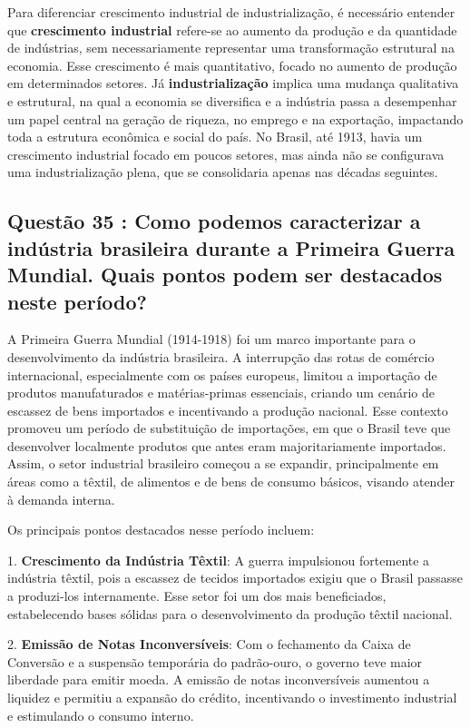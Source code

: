 \documentclass[a4paper,12pt]{article}[abntex2]
\begin{document}
Para diferenciar crescimento industrial de industrialização, é necessário entender que \textbf{crescimento industrial} refere-se ao aumento da produção e da quantidade de indústrias, sem necessariamente representar uma transformação estrutural na economia. Esse crescimento é mais quantitativo, focado no aumento de produção em determinados setores. Já \textbf{industrialização} implica uma mudança qualitativa e estrutural, na qual a economia se diversifica e a indústria passa a desempenhar um papel central na geração de riqueza, no emprego e na exportação, impactando toda a estrutura econômica e social do país. No Brasil, até 1913, havia um crescimento industrial focado em poucos setores, mas ainda não se configurava uma industrialização plena, que se consolidaria apenas nas décadas seguintes.

\subsection{\textbf{Questão 35 : Como podemos caracterizar a indústria brasileira durante a Primeira Guerra Mundial. Quais pontos podem ser destacados neste período?}}

A Primeira Guerra Mundial (1914-1918) foi um marco importante para o desenvolvimento da indústria brasileira. A interrupção das rotas de comércio internacional, especialmente com os países europeus, limitou a importação de produtos manufaturados e matérias-primas essenciais, criando um cenário de escassez de bens importados e incentivando a produção nacional. Esse contexto promoveu um período de substituição de importações, em que o Brasil teve que desenvolver localmente produtos que antes eram majoritariamente importados. Assim, o setor industrial brasileiro começou a se expandir, principalmente em áreas como a têxtil, de alimentos e de bens de consumo básicos, visando atender à demanda interna.

Os principais pontos destacados nesse período incluem:

1. \textbf{Crescimento da Indústria Têxtil}: A guerra impulsionou fortemente a indústria têxtil, pois a escassez de tecidos importados exigiu que o Brasil passasse a produzi-los internamente. Esse setor foi um dos mais beneficiados, estabelecendo bases sólidas para o desenvolvimento da produção têxtil nacional.

2. \textbf{Emissão de Notas Inconversíveis}: Com o fechamento da Caixa de Conversão e a suspensão temporária do padrão-ouro, o governo teve maior liberdade para emitir moeda. A emissão de notas inconversíveis aumentou a liquidez e permitiu a expansão do crédito, incentivando o investimento industrial e estimulando o consumo interno.
\end{document}
